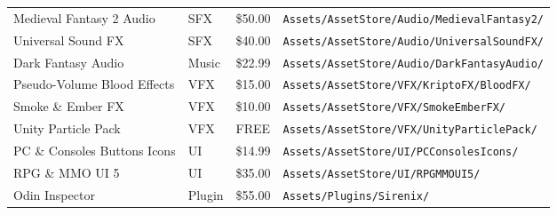 \begin{table}[!ht]
\begin{center}
\begin{tabular}{ >{\small}w{l}{11em} >{\small}w{c}{4em} >{\small}w{c}{3em} m{13em} }
        Medieval Fantasy 2 Audio     & SFX       &  \$50.00 & \texttt{\tiny Assets/AssetStore/Audio/MedievalFantasy2/} \\ 
        Universal Sound FX           & SFX       &  \$40.00 & \texttt{\tiny Assets/AssetStore/Audio/UniversalSoundFX/} \\
        \midrule
        Dark Fantasy Audio           & Music     &  \$22.99 & \texttt{\tiny Assets/AssetStore/Audio/DarkFantasyAudio/} \\
        \midrule
        Pseudo-Volume Blood Effects  & VFX       &  \$15.00 & \texttt{\tiny Assets/AssetStore/VFX/KriptoFX/BloodFX/}   \\ 
        Smoke \& Ember FX            & VFX       &  \$10.00 & \texttt{\tiny Assets/AssetStore/VFX/SmokeEmberFX/}       \\ 
        Unity Particle Pack          & VFX       &     FREE & \texttt{\tiny Assets/AssetStore/VFX/UnityParticlePack/}  \\
        \midrule
        PC \& Consoles Buttons Icons & UI        &  \$14.99 & \texttt{\tiny Assets/AssetStore/UI/PCConsolesIcons/}     \\ 
        RPG \& MMO UI 5              & UI        &  \$35.00 & \texttt{\tiny Assets/AssetStore/UI/RPGMMOUI5/}           \\
        \midrule
        Odin Inspector               & Plugin    &  \$55.00 & \texttt{\tiny Assets/Plugins/Sirenix/}                   \\ 
        \bottomrule
      \end{tabular}
    \end{center}
  \end{table}